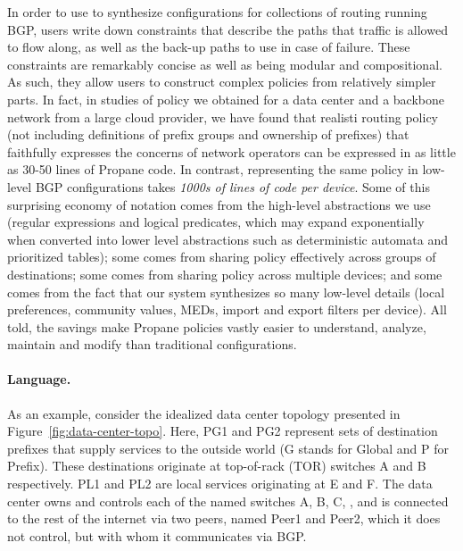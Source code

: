 In order to use \Name to synthesize configurations for collections
of routing running BGP, users write down constraints that 
describe the paths that traffic is allowed to flow along, as well
as the back-up paths to use in case of failure.  These constraints are
remarkably
concise as well as being modular and compositional.
As such, they allow users to construct complex policies
from relatively simpler parts.  In fact, in studies of policy we obtained
for a data center 
and a backbone network from a large cloud provider, we have found that 
realisti
routing policy (not including definitions of prefix groups and ownership of
prefixes) that faithfully expresses the concerns of network operators
can be expressed in as little as 30-50 lines of Propane
code.  In contrast, representing the same policy in low-level BGP 
configurations takes \emph{1000s of lines of code per device}.
Some of this surprising economy of notation comes from the high-level 
abstractions we use
(regular expressions and logical predicates, which may expand exponentially
when converted into lower level abstractions such as deterministic
automata and prioritized tables); some comes from sharing
policy effectively across groups of destinations; some comes from
sharing policy across multiple devices; and some comes from the fact
that our system synthesizes so many low-level details (local preferences,
community values, MEDs, import and export filters per device).  All told, 
the savings make Propane policies vastly
easier to understand, analyze, maintain and modify than traditional
configurations.

\paragraph*{Language.}
As an example, consider the idealized data center topology presented in
Figure~\ref{fig:data-center-topo}.  Here, PG1 and PG2 represent sets
of destination prefixes that supply services to the outside world (G stands
for Global and P for Prefix).  These destinations originate at top-of-rack (TOR)
switches A and B respectively.  PL1 and PL2 are local services originating
at E and F.  The data center owns and controls each of the named switches
A, B, C, \etc, and is connected to the rest of the internet via
two peers, named Peer1 and Peer2, which it does not control, but with
whom it communicates via BGP.

